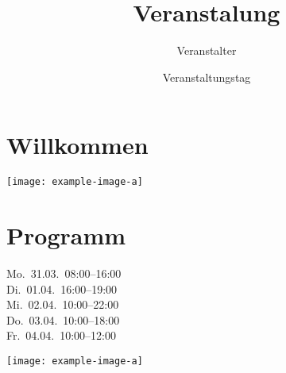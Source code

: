\documentclass{leaflet}
\begin{document}
 
\title{Veranstalung} 
\author{Veranstalter} 
\date{Veranstaltungstag} 
\maketitle 
\thispagestyle{empty}%
\clearpage 
\section{Willkommen} 
\blindtext 
\texttt{[image: example-image-a]}
 \clearpage 

 
\section{Programm}
 \begin{description} 
\item[Mo.\ 31.03.\ 08:00--16:00] 
\blindtext 
\item[Di.\ 01.04.\ 16:00--19:00] 
\blindtext 
\item[Mi.\ 02.04.\ 10:00--22:00] 
\blindtext \item[Do.\ 03.04.\ 10:00--18:00] 
\blindtext \item[Fr.\ 04.04.\ 10:00--12:00] 
\blindtext 
\end{description} 


\vfill
\centering
\texttt{[image: example-image-a]}

 
\end{document}
